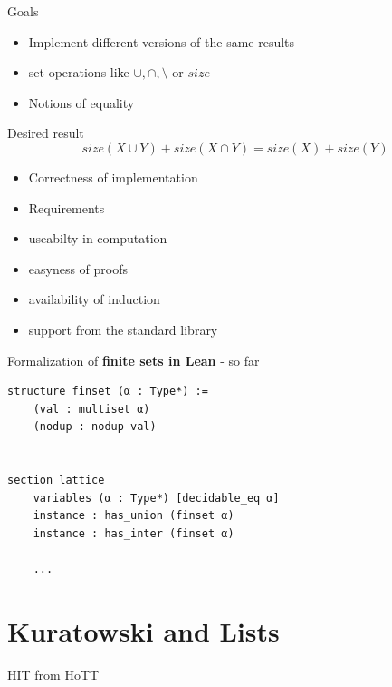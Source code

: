 \documentclass{beamer}
\begin{document}
    \begin{frame}{Goals}
        \begin{itemize}
            \item Implement different versions of the same results
            \item set operations like $\cup, \cap, \setminus$ or $size$
            \item Notions of equality
        \end{itemize}
        Desired result \[size(X \cup Y) + size (X \cap Y) = size(X) + size(Y)\]
        \begin{itemize}
            \item Correctness of implementation
            \item Requirements
            \item useabilty in computation
            \item easyness of proofs
            \item availability of induction
            \item support from the standard library
        \end{itemize}
    
    \end{frame}

    \begin{frame}[fragile]{Formalization of \textbf{finite sets in Lean} - so far}
        \begin{lstlisting}
structure finset (α : Type*) :=
    (val : multiset α)
    (nodup : nodup val)


section lattice
    variables (α : Type*) [decidable_eq α] 
    instance : has_union (finset α) 
    instance : has_inter (finset α)

    ...
        \end{lstlisting}
    \end{frame}
    \section{Kuratowski and Lists}
    \begin{frame}{HIT from HoTT}
        
    \end{frame}
\end{document}
